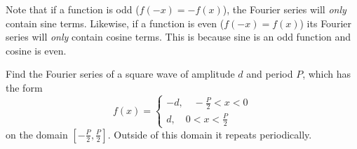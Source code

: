 \documentclass[../classical_mechanics.tex]{subfiles}
\begin{document}
        Note that if a function is odd ($f(-x)=-f(x)$), the Fourier series will \textit{only} contain sine terms.
        Likewise, if a function is even ($f(-x)=f(x)$) its Fourier series will \textit{only} contain cosine terms.
        This is because sine is an odd function and cosine is even.
        \begin{example}
            Find the Fourier series of a square wave of amplitude $d$ and period $P$, which has the form
            \begin{equation}
                f(x)=\begin{cases}
                    -d,\quad-\frac{P}{2}<x<0\\
                    d,\quad 0<x<\frac{P}{2}
                \end{cases}
            \end{equation}
            on the domain $\left[-\frac{P}{2},\frac{P}{2}\right]$.
            Outside of this domain it repeats periodically.


\end{example}
\end{document}
